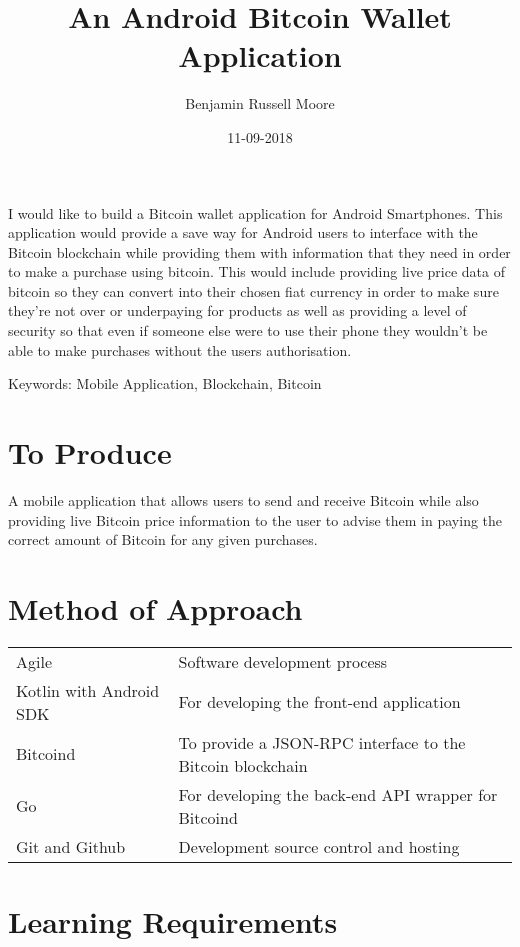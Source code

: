 \documentclass{article}
\title{An Android Bitcoin Wallet Application}
\author{Benjamin Russell Moore}
\date{11-09-2018}
\begin{document}
\maketitle

I would like to build a Bitcoin wallet application for Android Smartphones. This
application would provide a save way for Android users to interface with the
Bitcoin blockchain while providing them with information that they need in order
to make a purchase using bitcoin. This would include providing live price data
of bitcoin so they can convert into their chosen fiat currency in order to make
sure they're not over or underpaying for products as well as providing a level
of security so that even if someone else were to use their phone they wouldn't
be able to make purchases without the users authorisation.

\vspace{5mm}

Keywords: Mobile Application, Blockchain, Bitcoin

\section{To Produce}

A mobile application that allows users to send and receive Bitcoin while also
providing live Bitcoin price information to the user to advise them in paying
the correct amount of Bitcoin for any given purchases.

\section{Method of Approach}

\begin{center}
\begin{tabular}{ l l }
 Agile & Software development process \\ 
 Kotlin with Android SDK & For developing the front-end application \\  
 Bitcoind & To provide a JSON-RPC interface to the Bitcoin blockchain \\  
 Go & For developing the back-end API wrapper for Bitcoind \\  
 Git and Github & Development source control and hosting
\end{tabular}
\end{center}

\section{Learning Requirements}
\end{document}
